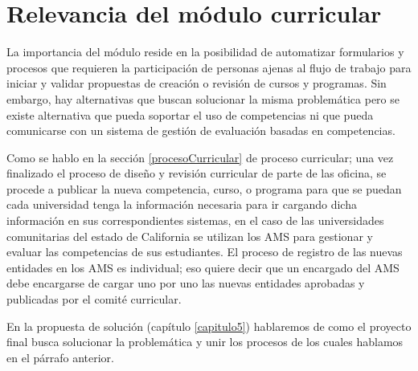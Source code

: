 \section{Relevancia del módulo curricular}
La importancia del módulo reside en la posibilidad de automatizar formularios y procesos que requieren la participación de personas ajenas al flujo de trabajo para iniciar y validar propuestas de creación o revisión de cursos y programas. Sin embargo, hay alternativas que buscan solucionar la misma problemática pero se existe alternativa que pueda soportar el uso de competencias ni que pueda comunicarse con un sistema de gestión de evaluación basadas en competencias.

Como se hablo en la sección \ref{procesoCurricular} de proceso curricular; una vez finalizado el proceso de diseño y revisión curricular de parte de las oficina, se procede a publicar la nueva competencia, curso, o programa para que se puedan cada universidad tenga la información necesaria para ir cargando dicha información en sus correspondientes sistemas, en el caso de las universidades comunitarias del estado de California se utilizan los AMS para gestionar y evaluar las competencias de sus estudiantes. El proceso de registro de las nuevas entidades en los AMS es individual; eso quiere decir que un encargado del AMS debe encargarse de cargar uno por uno las nuevas entidades aprobadas y publicadas por el comité curricular.

En la propuesta de solución (capítulo \ref{capitulo5}) hablaremos de como el proyecto final busca solucionar la problemática y unir los procesos de los cuales hablamos en el párrafo anterior.